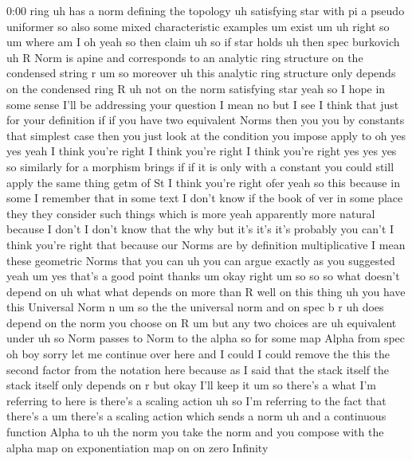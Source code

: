 \begin{unfinished}{0:00}
ring  uh  has  a
norm  defining  the  topology  uh  satisfying
star  with  pi  a  pseudo
uniformer  so  also  some  mixed
characteristic  examples  um
exist
um  uh  right  so
um  where  am  I  oh  yeah  so  then
claim  uh  so  if  star
holds  uh  then
spec
burkovich  uh  R  Norm  is
apine  and  corresponds  to  an  analytic
ring
structure  on  the  condensed  string
r
um  so
moreover  uh  this  analytic  ring
structure  only
depends  on  the  condensed  ring
R  uh  not  on  the
norm  satisfying
star
yeah  so  I  hope  in  some  sense  I'll  be
addressing  your  question  I  mean  no  but  I
see  I  think  that  just  for  your
definition  if  if  you  have  two  equivalent
Norms  then  you  you  by  constants  that
simplest  case  then  you  just  look  at  the
condition  you  impose  apply  to  oh  yes  yes
yeah  I  think  you're  right  I  think  you're
right  I  think  you're  right  yes  yes  yes
so  similarly  for  a  morphism  brings  if  if
it  is  only  with  a  constant  you  could
still  apply  the  same  thing  getm  of  St  I
think  you're  right  ofer  yeah  so  this
because  in  some  I  remember  that  in  some
text  I  don't  know  if  the  book  of  ver  in
some  place  they  they  consider  such
things  which  is  more  yeah  apparently
more  natural  because  I  don't  I  don't
know  that  the  why  but  it's  it's  it's
probably  you  can't  I  think  you're  right
that  because  our  Norms  are  by  definition
multiplicative  I  mean  these  geometric
Norms  that  you  can  uh  you  can  argue
exactly  as  you  suggested  yeah
um  yes  that's  a  good  point
thanks  um
okay  right  um  so  so  so  what  doesn't
depend
on  uh  what  what  depends  on  more  than  R
well  on  this  thing  uh  you  have  this
Universal  Norm  n  um  so  the  the  universal
norm  and  on  spec
b  r  uh  does
depend  on  the  norm  you  choose  on  R  um
but  any  two
choices  are  uh
equivalent  under  uh  so  Norm  passes  to
Norm  to  the  alpha  so  for
some  map  Alpha  from  spec  oh
boy  sorry  let  me  continue  over
here  and  I  could  I  could  remove  the  this
the  second  factor  from  the  notation  here
because  as  I  said  that  the  stack  itself
the  stack  itself  only  depends  on  r  but
okay  I'll  keep  it
um  so  there's  a  what  I'm  referring  to
here  is  there's  a  scaling  action  uh  so
I'm  referring  to  the  fact  that  there's
a
um  there's  a  scaling  action  which  sends
a  norm  uh  and  a  continuous  function
Alpha  to  uh  the  norm  you  take  the  norm
and  you  compose  with  the  alpha  map  on
exponentiation  map  on  on  zero  Infinity

\end{unfinished}
